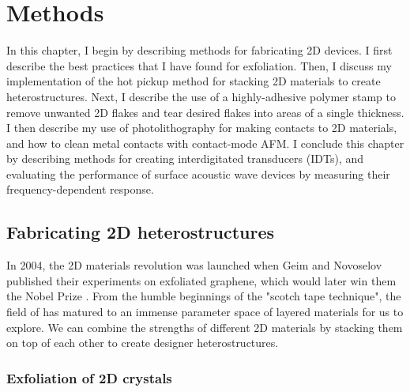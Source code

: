 \documentclass[double,12pt,1in,seploa]{beavtex}
\let\Oldsection\section
\renewcommand{\section}{\FloatBarrier\Oldsection}
\let\Oldsubsection\subsection
\renewcommand{\subsection}{\FloatBarrier\Oldsubsection}
\begin{document}

\chapter{Methods} \label{methods chapter}
In this chapter, I begin by describing methods for fabricating 2D devices. I first describe the best practices that I have found for exfoliation. Then, I discuss my implementation of the hot pickup method for stacking 2D materials to create heterostructures. Next, I describe the use of a highly-adhesive polymer stamp to remove unwanted 2D flakes and tear desired flakes into areas of a single thickness. I then describe my use of photolithography for making contacts to 2D materials, and how to clean metal contacts with contact-mode AFM. I conclude this chapter by describing methods for creating interdigitated transducers (IDTs), and evaluating the performance of surface acoustic wave devices by measuring their frequency-dependent response.

\section{Fabricating 2D heterostructures} \label{fabricating 2D devices}

In 2004, the 2D materials revolution was launched when Geim and Novoselov published their experiments on exfoliated graphene, which would later win them the Nobel Prize \cite{novoselov_electric_2004}. From the humble beginnings of the "scotch tape technique", the field of has matured to an immense parameter space of layered materials for us to explore. We can combine the strengths of different 2D materials by stacking them on top of each other to create designer heterostructures.

\subsection{Exfoliation of 2D crystals}
\end{document}
